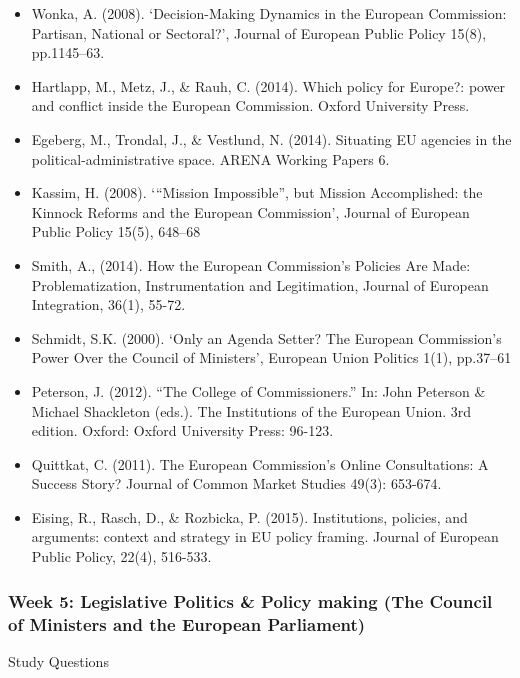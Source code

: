 \begin{itemize}
	\item Wonka, A. (2008). ‘Decision-Making Dynamics in the European Commission: Partisan, National or Sectoral?’, Journal of European Public Policy 15(8), pp.1145–63.
	\item Hartlapp, M., Metz, J., \& Rauh, C. (2014). Which policy for Europe?: power and conflict inside the European Commission. Oxford University Press.
	\item Egeberg, M., Trondal, J., \& Vestlund, N. (2014). Situating EU agencies in the political-administrative space. ARENA Working Papers 6.
    \item Kassim, H. (2008). ‘“Mission Impossible”, but Mission Accomplished: the Kinnock Reforms and the European Commission’, Journal of European Public Policy 15(5), 648–68
    \item Smith, A., (2014). How the European Commission’s Policies Are Made: Problematization, Instrumentation and Legitimation, Journal of European Integration, 36(1), 55-72.
    \item Schmidt, S.K. (2000). ‘Only an Agenda Setter? The European Commission’s Power Over the Council of Ministers’, European Union Politics 1(1), pp.37–61
    \item Peterson, J. (2012). “The College of Commissioners.” In: John Peterson \& Michael Shackleton (eds.). The Institutions of the European Union. 3rd edition. Oxford: Oxford University Press: 96-123.
    \item Quittkat, C. (2011). The European Commission's Online Consultations: A Success Story? Journal of Common Market Studies 49(3): 653-674.
	\item Eising, R., Rasch, D., \& Rozbicka, P. (2015). Institutions, policies, and arguments: context and strategy in EU policy framing. Journal of European Public Policy, 22(4), 516-533.
\end{itemize}

\subsubsection*{Week 5: Legislative Politics \& Policy making (The Council of Ministers and the European Parliament)}

Study Questions

